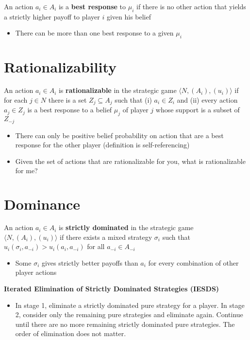 \documentclass{report}
\begin{document}
An action $a_i \in A_i$ is a \textbf{best response} to $\mu_i$ if there is no other action that yields a strictly higher payoff to player $i$ given his belief 
\begin{itemize}
	\item{There can be more than one best response to a given $\mu_i$}
\end{itemize}
\medskip

\section*{Rationalizability}\medskip

An action $a_i \in A_i$ is \textbf{rationalizable} in the strategic game $\langle N,(A_i),(u_i) \rangle$ if for each $j \in N$ there is a set $Z_j \subseteq A_j$ such that (i) $a_i \in Z_i$ and (ii) every action $a_j \in Z_j$ is a best response to a belief $\mu_j$ of player $j$ whose support is a subset of $Z_{-j}$
\begin{itemize}
	\item{There can only be positive belief probability on action that are a best response for the other player (definition is self-referencing)}
	\item{Given the set of actions that are rationalizable for you, what is rationalizable for me?} 
\end{itemize} \medskip

\section*{Dominance}\medskip

An action $a_i \in A_i$ is \textbf{strictly dominated} in the strategic game $\langle N,(A_i),(u_i) \rangle$ if there exists a mixed strategy $\sigma_i$ such that $u_i(\sigma_i,a_{-i}) > u_i(a_i,a_{-i})$ for all $a_{-i} \in A_{-i}$
\begin{itemize}
	\item{Some $\sigma_i$ gives strictly better payoffs than $a_i$ for every combination of other player actions}
\end{itemize} \bigskip

\textbf{Iterated Elimination of Strictly Dominated Strategies (IESDS)}
\begin{itemize}
	\item{In stage 1, eliminate a strictly dominated pure strategy for a player. In stage 2, consider only the remaining pure strategies and eliminate again. Continue until there are no more remaining strictly dominated pure strategies. The order of elimination does not matter.}
\end{itemize}\bigskip
\end{document}
